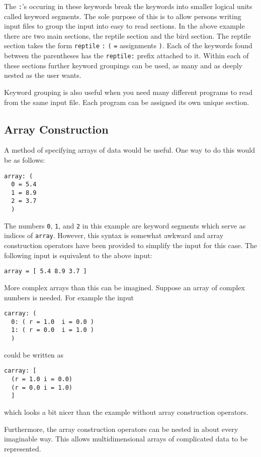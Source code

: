 The \verb|:|'s occuring in these keywords break the keywords into
smaller logical units called keyword segments.  The sole purpose of this
is to allow persons writing input files to group the input into easy to
read sections.  In the above example there are two main sections, the
reptile section and the bird section.  The reptile section takes the
form \verb|reptile| \verb|:| \verb|(|  \verb|=| 
assignments \verb|)|.  Each of the keywords found between the
parentheses has the \verb|reptile:| prefix attached to it.  Within each
of these sections further keyword groupings can be used, as many and as
deeply nested as the user wants.

Keyword grouping is also useful when you need many different programs to
read from the same input file.  Each program can be assigned its own
unique section.

\subsection{Array Construction}

A method of specifying arrays of data would be useful.  One way to
do this would be as follows:
\begin{verbatim}
array: (
  0 = 5.4
  1 = 8.9
  2 = 3.7
  )
\end{verbatim}
The numbers \verb|0|, \verb|1|, and \verb|2| in this example are keyword
segments which serve as indices of \verb|array|.  However, this syntax
is somewhat awkward and array construction operators have been provided
to simplify the input for this case.  The following input is equivalent
to the above input:
\begin{verbatim}
array = [ 5.4 8.9 3.7 ]
\end{verbatim}

More complex arrays than this can be imagined.  Suppose an array of
complex numbers is needed.  For example the input
\begin{verbatim}
carray: (
  0: ( r = 1.0  i = 0.0 )
  1: ( r = 0.0  i = 1.0 )
  )
\end{verbatim}
could be written as
\begin{verbatim}
carray: [
  (r = 1.0 i = 0.0)
  (r = 0.0 i = 1.0)
  ]
\end{verbatim}
which looks a bit nicer than the example without array construction
operators.

Furthermore, the array construction operators can be nested in about
every imaginable way.  This allows multidimensional arrays of
complicated data to be represented.

